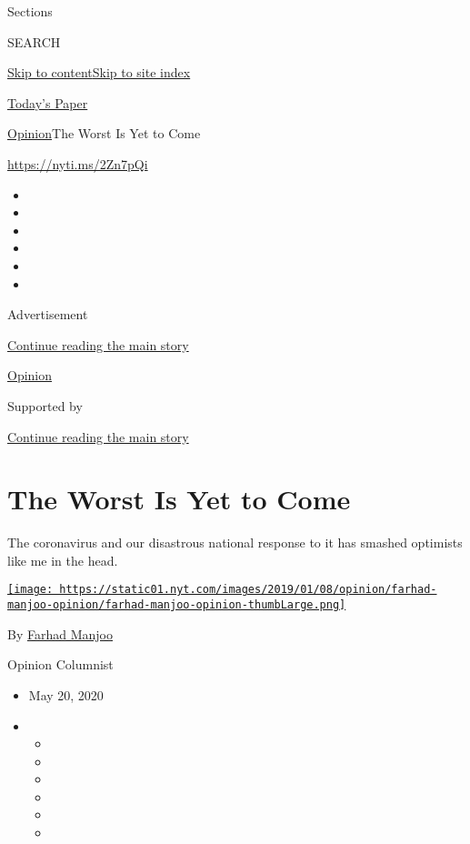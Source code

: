 Sections

SEARCH

\protect\hyperlink{site-content}{Skip to
content}\protect\hyperlink{site-index}{Skip to site index}

\href{https://myaccount.nytimes.com/auth/login?response_type=cookie\&client_id=vi}{}

\href{https://www.nytimes.com/section/todayspaper}{Today's Paper}

\href{/section/opinion}{Opinion}\textbar{}The Worst Is Yet to Come

\href{https://nyti.ms/2Zn7pQi}{https://nyti.ms/2Zn7pQi}

\begin{itemize}
\item
\item
\item
\item
\item
\item
\end{itemize}

Advertisement

\protect\hyperlink{after-top}{Continue reading the main story}

\href{/section/opinion}{Opinion}

Supported by

\protect\hyperlink{after-sponsor}{Continue reading the main story}

\hypertarget{the-worst-is-yet-to-come}{%
\section{The Worst Is Yet to Come}\label{the-worst-is-yet-to-come}}

The coronavirus and our disastrous national response to it has smashed
optimists like me in the head.

\href{https://www.nytimes.com/by/farhad-manjoo}{\texttt{[image: https://static01.nyt.com/images/2019/01/08/opinion/farhad-manjoo-opinion/farhad-manjoo-opinion-thumbLarge.png]}}

By \href{https://www.nytimes.com/by/farhad-manjoo}{Farhad Manjoo}

Opinion Columnist

\begin{itemize}
\item
  May 20, 2020
\item
  \begin{itemize}
  \item
  \item
  \item
  \item
  \item
  \item
  \end{itemize}
\end{itemize}

